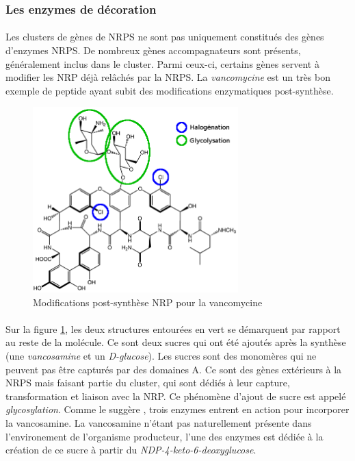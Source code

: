 \documentclass[12pt,french,twoside]{report}
\begin{document}
\subsubsection{Les enzymes de décoration}

\paragraph{}Les clusters de gènes de NRPS ne sont pas uniquement constitués des gènes d'enzymes NRPS.
De nombreux gènes accompagnateurs sont présents, généralement inclus dans le cluster.
Parmi ceux-ci, certains gènes servent à modifier les NRP déjà relâchés par la NRPS.
La \textit{vancomycine} est un très bon exemple de peptide ayant subit des modifications enzymatiques post-synthèse.

\begin{figure}[h!]
  \begin{center}
    \includegraphics[width=300px]{Figures/bio/Intro/vanco.png}
    \caption{\label{vanco}Modifications post-synthèse NRP pour la vancomycine}
  \end{center}
\end{figure}

\paragraph{}Sur la figure \ref{vanco}, les deux structures entourées en vert se démarquent par rapport au reste de la molécule.
Ce sont deux sucres qui ont été ajoutés après la synthèse (une \textit{vancosamine} et un \textit{D-glucose}).
Les sucres sont des monomères qui ne peuvent pas être capturés par des domaines A.
Ce sont des gènes extérieurs à la NRPS mais faisant partie du cluster, qui sont dédiés à leur capture, transformation et liaison avec la NRP.
Ce phénomène d'ajout de sucre est appelé \textit{glycosylation}.
Comme le suggère \cite{van_wageningen_sequencing_1998}, trois enzymes entrent en action pour incorporer la vancosamine.
La vancosamine n'étant pas naturellement présente dans l'environement de l'organisme producteur, l'une des enzymes est dédiée à la création de ce sucre à partir du \textit{NDP-4-keto-6-deoxyglucose}.
\end{document}
